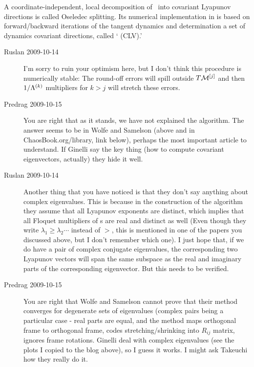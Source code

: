 A coordinate-independent, local decomposition of \statesp\
into covariant Lyapunov directions is called Oseledec
splitting.
Its numerical implementation in 
is based on forward/backward
iterations of the tangent dynamics and determination
a set of dynamics covariant directions,
called `{\cLvs} (CLV).'

\begin{description}
  \item[Ruslan 2009-10-14] I'm sorry to ruin your optimism
      here, but I don't think this procedure is numerically
      stable: The round-off errors will spill outside
      $T\mathcal{M}^{[j]}$ and then $1/\Lambda^{(k)}$ multipliers
      for $k > j$ will stretch these errors.

\item[Predrag 2009-10-15]
You are right that as it stands, we have not explained the
algorithm. The answer seems to be in Wolfe and
Samelson (above and in ChaosBook.org/library, link
below), perhaps the most important article to understand.
If Ginelli \etal{} say the key thing (how
to compute covariant eigenvectors, actually) they hide it
well.

  \item[Ruslan 2009-10-14]
Another thing that you have noticed is that they don't say
anything about complex eigenvalues.  This is because in the
construction of the algorithm they assume that all Lyapunov
exponents are distinct, which implies that all Floquet
multipliers of {\po s} are real and distinct as well
(Even though they write $\lambda_1 \geq \lambda_2 \cdots$
instead of $>$, this is mentioned in one of the papers you
discussed above, but I don't remember which one).  I just
hope that, if we do have a pair of complex conjugate
eigenvalues, the corresponding two Lyapunov vectors will span
the same subspace as the real and imaginary parts of the
corresponding eigenvector.  But this needs to be verified.

\item[Predrag 2009-10-15]
You are right that Wolfe and Samelson cannot prove
that their method converges for degenerate sets of eigenvalues
(complex pairs being a particular case - real parts are
equal, and the method maps orthogonal frame to orthogonal
frame, codes stretching/shrinking into $R_{ij}$ matrix,
ignores frame rotations. Ginelli \etal{}
deal with complex eigenvalues (see the plots I copied to the
blog above), so I guess it works. I might ask Takeuchi how
they really do it.


\end{description}
